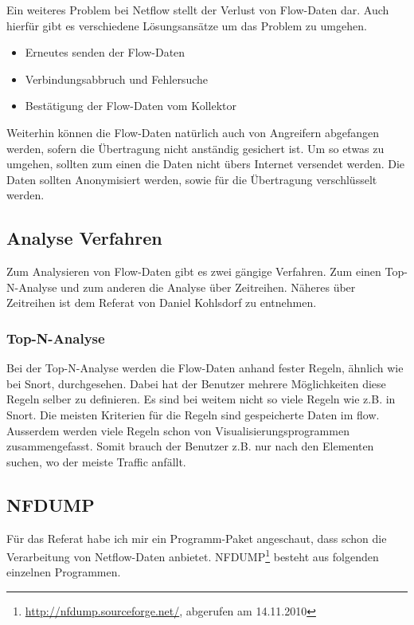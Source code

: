 Ein weiteres Problem bei Netflow stellt der Verlust von Flow-Daten dar.
Auch hierfür gibt es verschiedene Lösungsansätze um das Problem zu umgehen.

\begin{itemize}
  \item Erneutes senden der Flow-Daten
  \item Verbindungsabbruch und Fehlersuche
  \item Bestätigung der Flow-Daten vom Kollektor
\end{itemize}

Weiterhin können die Flow-Daten natürlich auch von Angreifern abgefangen
werden, sofern die Übertragung nicht anständig gesichert ist. Um so etwas
zu umgehen, sollten zum einen die Daten nicht übers Internet versendet
werden. Die Daten sollten Anonymisiert werden, sowie für die Übertragung
verschlüsselt werden.

\subsection{Analyse Verfahren}

Zum Analysieren von Flow-Daten gibt es zwei gängige Verfahren. Zum einen
Top-N-Analyse und zum anderen die Analyse über Zeitreihen. 
Näheres über Zeitreihen ist dem Referat von Daniel Kohlsdorf zu entnehmen.

\subsubsection{Top-N-Analyse}

Bei der Top-N-Analyse werden die Flow-Daten anhand fester Regeln, ähnlich
wie bei Snort, durchgesehen. Dabei hat der Benutzer mehrere Möglichkeiten
diese Regeln selber zu definieren. Es sind bei weitem nicht so viele
Regeln wie z.B. in Snort. Die meisten Kriterien für die Regeln sind
gespeicherte Daten im flow. Ausserdem werden viele Regeln schon von
Visualisierungsprogrammen zusammengefasst. Somit brauch der Benutzer
z.B. nur nach den Elementen suchen, wo der meiste Traffic anfällt. 

\subsection{NFDUMP}

Für das Referat habe ich mir ein Programm-Paket angeschaut, dass schon
die Verarbeitung von Netflow-Daten anbietet. NFDUMP\footnote{%
\url{http://nfdump.sourceforge.net/}, abgerufen am 14.11.2010} besteht
aus folgenden einzelnen Programmen.

